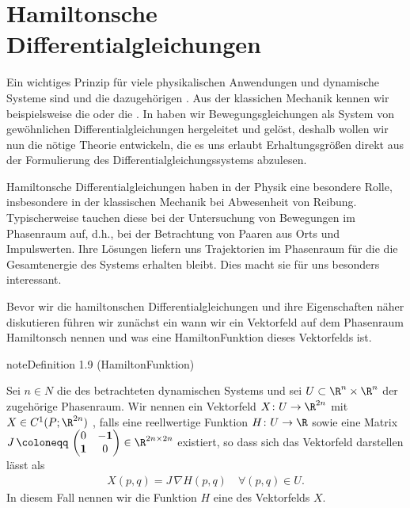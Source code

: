 \documentclass[letterpaper,10pt,german]{jupyterBook}
\begin{document}
\section{Hamiltonsche Differentialgleichungen}
\label{\detokenize{ode/hamilton:hamiltonsche-differentialgleichungen}}\label{\detokenize{ode/hamilton::doc}}
\sphinxAtStartPar
Ein wichtiges Prinzip für viele physikalischen Anwendungen und dynamische Systeme sind  und die dazugehörigen .
Aus der klassichen Mechanik kennen wir beispielsweise die  oder die .
In {\hyperref[\detokenize{ode/fluesse:s-fluesse}]{}} haben wir Bewegungsgleichungen als System von gewöhnlichen Differentialgleichungen hergeleitet und gelöst, deshalb wollen wir nun die nötige Theorie entwickeln, die es uns erlaubt Erhaltungsgrößen direkt aus der Formulierung des Differentialgleichungssystems abzulesen.

\sphinxAtStartPar
Hamiltonsche Differentialgleichungen haben in der Physik eine besondere Rolle, insbesondere in der klassischen Mechanik bei Abwesenheit von Reibung.
Typischerweise tauchen diese bei der Untersuchung von Bewegungen im Phasenraum auf, d.h., bei der Betrachtung von Paaren aus Orts\sphinxhyphen{} und Impulswerten.
Ihre Lösungen liefern uns Trajektorien im Phasenraum für die die Gesamtenergie des Systems erhalten bleibt.
Dies macht sie für uns besonders interessant.

\sphinxAtStartPar
Bevor wir die hamiltonschen Differentialgleichungen und ihre Eigenschaften näher diskutieren führen wir zunächst ein wann wir ein Vektorfeld auf dem Phasenraum Hamiltonsch nennen und was eine Hamilton\sphinxhyphen{}Funktion dieses Vektorfelds ist.
\label{ode/hamilton:def:hamiltonsch}
\begin{sphinxadmonition}{note}{Definition 1.9 (Hamilton\sphinxhyphen{}Funktion)}



\sphinxAtStartPar
Sei \(n \in N\) die  des betrachteten dynamischen Systems und sei \(U\subset \R^n \times \R^n\) der zugehörige Phasenraum.
Wir nennen ein Vektorfeld \(X \colon U \rightarrow \R^{2n}\) mit \(X \in C^1(P;\R^{2n})\) , falls eine reellwertige Funktion \(H \colon U \rightarrow \R\) sowie eine Matrix \(J \, \coloneqq \, \begin{pmatrix}0 & -\mathbf{1}\\ \mathbf{1} & 0 \end{pmatrix} \in \R^{2n \times 2n}\) existiert, so dass sich das Vektorfeld darstellen lässt als
\begin{equation}\label{equation:ode/hamilton:eq:hamilton_Gleichung}
\begin{split}X(p,q) = J \, \nabla H (p,q) \quad \forall (p,q) \in U.\end{split}
\end{equation}
\sphinxAtStartPar
In diesem Fall nennen wir die Funktion \(H\) eine  des Vektorfelds \(X\).
\end{sphinxadmonition}
\end{document}
